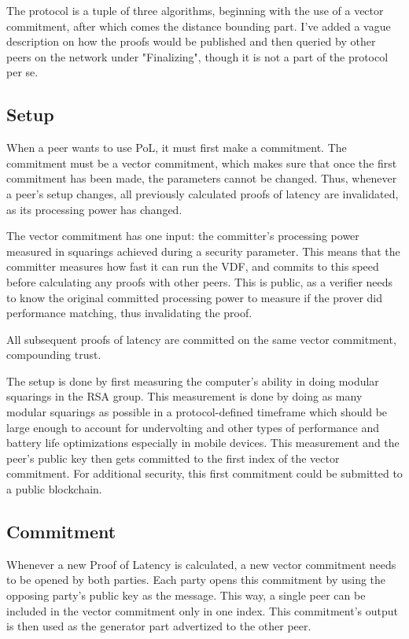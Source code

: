 The protocol is a tuple of three algorithms, beginning with the use of a vector commitment, after which comes the distance bounding part. I've added a vague description on how the proofs would be published and then queried by other peers on the network under "Finalizing", though it is not a part of the protocol per se.

\subsection{Setup}
When a peer wants to use PoL, it must first make a commitment. The commitment must be a vector commitment, which makes sure that once the first commitment has been made, the parameters cannot be changed. Thus, whenever a peer's setup changes, all previously calculated proofs of latency are invalidated, as its processing power has changed.

The vector commitment has one input: the committer's processing power measured in squarings achieved during a security parameter. This means that the committer measures how fast it can run the VDF, and commits to this speed before calculating any proofs with other peers. This is public, as a verifier needs to know the original committed processing power to measure if the prover did performance matching, thus invalidating the proof.

All subsequent proofs of latency are committed on the same vector commitment, compounding trust.

The setup is done by first measuring the computer's ability in doing modular squarings in the RSA group. This measurement is done by doing as many modular squarings as possible in a protocol-defined timeframe which should be large enough to account for undervolting and other types of performance and battery life optimizations especially in mobile devices. This measurement and the peer's public key then gets committed to the first index of the vector commitment. For additional security, this first commitment could be submitted to a public blockchain.

\subsection{Commitment}
Whenever a new Proof of Latency is calculated, a new vector commitment needs to be opened by both parties. Each party opens this commitment by using the opposing party's public key as the message. This way, a single peer can be included in the vector commitment only in one index. This commitment's output is then used as the generator part advertized to the other peer.

